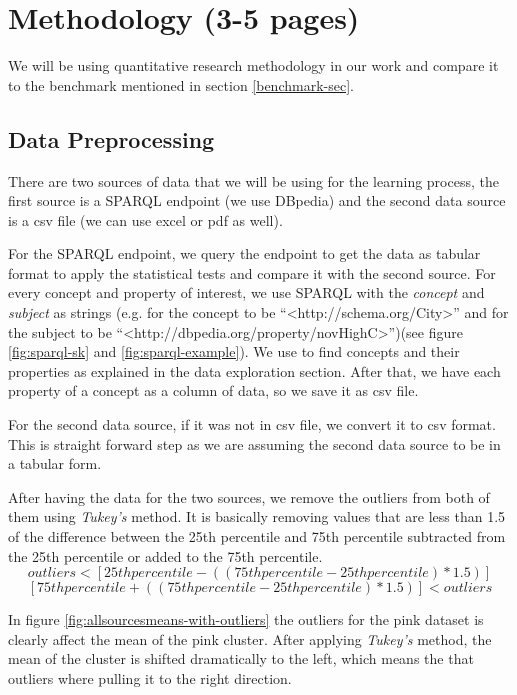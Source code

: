 \documentclass{article}
\newcommand{\comm}[2][inline]{\color{red} #2 \color{black}}
\begin{document}
\section{Methodology (3-5 pages)}
We will be using quantitative research methodology in our work and compare it to the benchmark mentioned in section \ref{benchmark-sec}. %

\subsection{Data Preprocessing} \label{datapreprocessing-sec}



There are two sources of data that we will be using for the learning process, the first source is a SPARQL endpoint \cite{w3c-sparql} (we use DBpedia) and the second data source is a csv file (we can use excel or pdf as well). 

For the SPARQL endpoint, we query the endpoint to get the data as tabular format to apply the statistical tests and compare it with the second source. For every concept and property of interest,%
we use SPARQL with the \textit{concept} and \textit{subject} as strings (e.g. for the concept to be ``\textless http://schema.org/City\textgreater '' and for the subject to be ``\textless http://dbpedia.org/property/novHighC\textgreater'')(see figure \ref{fig:sparql-sk} and \ref{fig:sparql-example}). We use \cite{loupe} to find concepts and their properties as explained in the data exploration section. After that, we have each property of a concept as a column of data, so we save it as csv file.

For the second data source, if it was not in csv file, we convert it to csv format. This is straight forward step as we are assuming the second data source to be in a tabular form. 

After having the data for the two sources, we remove the outliers from both of them using \textit{Tukey\rq s} method. It is basically removing values that are less than 1.5 of the difference between the 25th percentile and 75th percentile subtracted from the 25th percentile or added to the 75th percentile. 
$$ outliers < [25th percentile - ( ( 75th percentile - 25th percentile )*1.5)] $$
$$ [ 75th percentile + ( ( 75th percentile - 25th percentile )*1.5)] < outliers  $$

In figure \ref{fig:allsourcesmeans-with-outliers} the outliers for the pink dataset is clearly affect the mean of the pink cluster. After applying \textit{Tukey\rq s} method, the mean of the cluster is shifted dramatically to the left, which means the that outliers where pulling it to the right direction.
\end{document}
